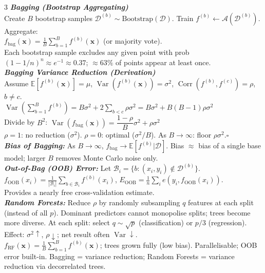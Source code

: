 \documentclass[a4paper,7pt]{article}
\begin{document}
\begin{multicols*}{3}
\textit{\textbf{Bagging (Bootstrap Aggregating)}}\\
Create $B$ bootstrap samples $\mathcal{D}^{(b)}\sim\mathrm{Bootstrap}(\mathcal{D})$. Train $f^{(b)}\leftarrow\mathcal{A}(\mathcal{D}^{(b)})$. Aggregate:\\
$f_\mathrm{bag}(\mathbf{x})=\frac{1}{B}\sum_{b=1}^B f^{(b)}(\mathbf{x})$ (or majority vote).\\
Each bootstrap sample excludes any given point with prob $(1-1/n)^n\approx e^{-1}\approx 0.37$; $\approx 63\%$ of points appear at least once.\\

\textit{\textbf{Bagging Variance Reduction (Derivation)}}\\
Assume $\mathbb{E}[f^{(b)}(\mathbf{x})]=\mu$, $\operatorname{Var}(f^{(b)}(\mathbf{x}))=\sigma^2$, $\operatorname{Corr}(f^{(b)},f^{(c)})=\rho$, $b\neq c$.\\
$\operatorname{Var}\!\left(\sum_{b=1}^B f^{(b)}\right)=B\sigma^2+2\sum_{b<c}\rho\sigma^2=B\sigma^2+B(B-1)\rho\sigma^2$\\
Divide by $B^2$:
$\operatorname{Var}(f_\mathrm{bag}(\mathbf{x}))=\dfrac{1-\rho}{B}\sigma^2+\rho\sigma^2$\\
$\rho=1$: no reduction ($\sigma^2$). $\rho=0$: optimal ($\sigma^2/B$). As $B\to\infty$: floor $\rho\sigma^2$.\hfill$\square$\\

\textit{\textbf{Bias of Bagging:}} As $B\to\infty$, $f_\mathrm{bag}\to\mathbb{E}[f^{(b)}|\mathcal{D}]$. Bias $\approx$ bias of a single base model; larger $B$ removes Monte Carlo noise only.\\

\textit{\textbf{Out-of-Bag (OOB) Error:}} Let $\mathcal{B}_i=\{b:(x_i,y_i)\notin\mathcal{D}^{(b)}\}$.\\
$f_\mathrm{OOB}(x_i)=\frac{1}{|\mathcal{B}_i|}\sum_{b\in\mathcal{B}_i}f^{(b)}(x_i)$, $E_\mathrm{OOB}=\frac{1}{n}\sum_i e(y_i,f_\mathrm{OOB}(x_i))$.\\
Provides a nearly free cross-validation estimate.\\

\textit{\textbf{Random Forests:}} Reduce $\rho$ by randomly subsampling $q$ features at each split (instead of all $p$). Dominant predictors cannot monopolise splits; trees become more diverse. At each split: select $q\sim\sqrt{p}$ (classification) or $p/3$ (regression). Effect: $\sigma^2\uparrow$, $\rho\downarrow$; net result often $\operatorname{Var}\downarrow$.\\
$f_\mathrm{RF}(\mathbf{x})=\frac{1}{B}\sum_{b=1}^B f^{(b)}(\mathbf{x})$; trees grown fully (low bias). Parallelisable; OOB error built-in. Bagging = variance reduction; Random Forests = variance reduction via decorrelated trees.\\


\end{multicols*}
\end{document}
